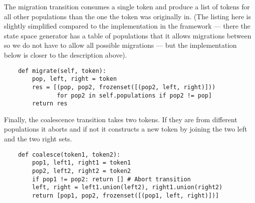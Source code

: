 The migration transition consumes a single token and produce a list of tokens for all other populations than the one the token was originally in. (The listing here is slightly simplified compared to the implementation in the framework --- there the state space generator has a table of populations that it allows migrations between so we do not have to allow all possible migrations --- but the implementation below is closer to the description above).

\begin{lstlisting}
    def migrate(self, token):
        pop, left, right = token
        res = [(pop, pop2, frozenset([(pop2, left, right)]))
               for pop2 in self.populations if pop2 != pop]
        return res	
\end{lstlisting}

Finally, the coalescence transition takes two tokens. If they are from different populations it aborts and if not it constructs a new token by joining the two left and the two right sets.

\begin{lstlisting}
    def coalesce(token1, token2):
        pop1, left1, right1 = token1
        pop2, left2, right2 = token2
        if pop1 != pop2: return [] # Abort transition
        left, right = left1.union(left2), right1.union(right2)
        return [pop1, pop2, frozenset([(pop1, left, right)])]
\end{lstlisting}


